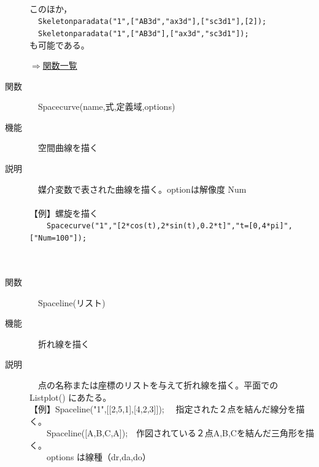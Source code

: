 \documentclass[papersize,a4paper,12pt,uplatex]{jsarticle}
\begin{document}
\begin{description}
　　
　　

このほか，\\
　\verb|Skeletonparadata("1",["AB3d","ax3d"],["sc3d1"],[2]);|\\
　\verb|Skeletonparadata("1",["AB3d"],["ax3d","sc3d1"]);|\\
も可能である。

\begin{flushright} \hyperlink{functionlist3d}{$\Rightarrow$関数一覧}\end{flushright}

\hypertarget{spacecurve}{}
\item[関数]　Spacecurve(name,式,定義域,options)
\item[機能]　空間曲線を描く
\item[説明]　媒介変数で表された曲線を描く。optionは解像度 Num\\
　\\
【例】螺旋を描く\\
　　\verb|Spacecurve("1","[2*cos(t),2*sin(t),0.2*t]","t=[0,4*pi]",["Num=100"]);|\\
　\\
　　　　　\\

\hypertarget{spaceline}{}
\item[関数]　Spaceline(リスト)
\item[機能]　折れ線を描く
\item[説明]　点の名称または座標のリストを与えて折れ線を描く。平面での Listplot() にあたる。\\
【例】Spaceline("1",[[2,5,1],[4,2,3]]); 　指定された２点を結んだ線分を描く。\\
　　Spaceline([A,B,C,A]);　作図されている２点A,B,Cを結んだ三角形を描く。\\
　　options は線種（dr,da,do）\\
　\\


\end{description}
\end{document}
